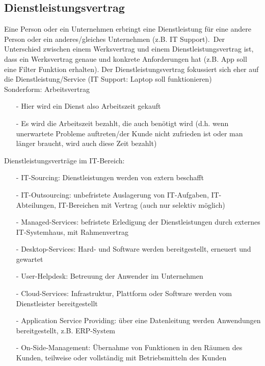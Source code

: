 \documentclass[asp1.tex]{subfiles}
\begin{document}
\subsection{Dienstleistungsvertrag} Eine Person oder ein Unternehmen erbringt eine Dienstleistung für eine andere Person oder ein anderes/gleiches Unternehmen (z.B. IT Support).\
Der Unterschied zwischen einem Werksvertrag und einem Dienstleistungsvertrag ist, dass ein Werksvertrag genaue und konkrete Anforderungen hat (z.B. App soll eine Filter Funktion erhalten). Der Dienstleistungsvertrag fokussiert sich eher auf die Dienstleistung/Service (IT Support: Laptop soll funktionieren)\\
Sonderform: Arbeitsvertrag
\begin{itemize}
    \item[-] Hier wird ein Dienst also Arbeitszeit gekauft
    \item[-]Es wird die Arbeitszeit bezahlt, die auch benötigt wird (d.h. wenn unerwartete Probleme auftreten/der Kunde nicht zufrieden ist oder man länger braucht, wird auch diese Zeit bezahlt)
\end{itemize}

Dienstleistungsverträge im IT-Bereich:\
\begin{itemize}
    \item[-]IT-Sourcing: Dienstleistungen werden von extern beschafft
    \item[-]IT-Outsourcing: unbefristete Auslagerung von IT-Aufgaben, IT-Abteilungen, IT-Bereichen mit Vertrag (auch nur selektiv möglich)
    \item[-]Managed-Services: befristete Erledigung der Dienstleistungen durch externes IT-Systemhaus, mit Rahmenvertrag
    \item[-]Desktop-Services: Hard- und Software werden bereitgestellt, erneuert und gewartet
    \item[-]User-Helpdesk: Betreuung der Anwender im Unternehmen
    \item[-]Cloud-Services: Infrastruktur, Plattform oder Software werden vom Dienstleister bereitgestellt
    \item[-]Application Service Providing: über eine Datenleitung werden Anwendungen bereitgestellt, z.B. ERP-System
    \item[-]On-Side-Management: Übernahme von Funktionen in den Räumen des Kunden, teilweise oder vollständig mit Betriebsmitteln des Kunden
\end{itemize}

\break
\end{document}

